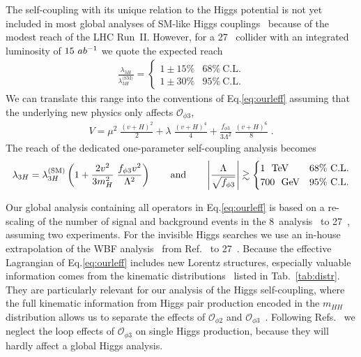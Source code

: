 The self-coupling with its unique relation to the Higgs potential is
not yet included in most global analyses of SM-like Higgs 
couplings~\cite{Ellis:2018gqa,Alves:2018nof,Biekotter:2018rhp}
because of the modest reach of the LHC Run~II.  
However, for a 27~\UTeV
collider with an integrated luminosity of $15~ab^{-1}$ we quote the
expected reach~\cite{Goncalves:2018yva}
%
\begin{align}
\frac{\lambda_{3H}}{\lambda_{3H}^\text{(SM)}}
=\begin{cases} 
1 \pm 15\% &  68\%~\text{C.L.} \\
1 \pm 30\% &  95\%~\text{C.L.} 
\end{cases}
\label{eq:reach_lam}
\end{align}
%
We can translate this range into the conventions of
Eq.\eqref{eq:ourleff} assuming that the underlying new physics
only affects $\mathcal{O}_{\phi 3}$,
%
\begin{align}
V = \mu^2 \; \frac{(v+H)^2}{2} 
  + \lambda \; \frac{(v+H)^4}{4} 
  + \frac{f_{\phi 3}}{3 \Lambda^2} \; \frac{(v+H)^6}{8} \; .
\end{align}
%
The reach of the dedicated one-parameter self-coupling
analysis becomes
%
\begin{align}
\lambda_{3H} 
= \lambda_{3H}^\text{(SM)}
  \left( 1 + \frac{2 v^2}{3 m_H^2} \; \frac{f_{\phi 3} v^2}{\Lambda^2} \right) 
\qquad \text{and} \qquad
\left| \frac{\Lambda}{\sqrt{f_{\phi 3}}} \right| \gtrsim
\begin{cases}
1~\text{\ensuremath{~\text{TeV}}} &  68\%~\text{C.L.} \\
700~\text{\ensuremath{~\text{GeV}}} &  95\%~\text{C.L.} 
\end{cases}
\label{eq:reach_d6}
\end{align}

Our global analysis containing all operators in Eq.\eqref{eq:ourleff}
is based on a re-scaling of the number of signal and background events 
in the 8~\UTeV analysis~\cite{Corbett:2015ksa} to 27~\UTeV, assuming two
experiments. For the invisible Higgs searches we use an in-house extrapolation of
the WBF analysis~\cite{Eboli:2000ze} from Ref.~\cite{Biekotter:2017gyu} to 27~\UTeV.  
Because the effective Lagrangian of Eq.\eqref{eq:ourleff} includes new
Lorentz structures, especially valuable information comes from the
kinematic distributions~\cite{Englert:2015hrx,Corbett:2015ksa} listed in Tab.~\ref{tab:distr}.
They are particularly relevant for our analysis of the Higgs self-coupling,
where the full kinematic information from Higgs pair production encoded in
the $m_{HH}$ distribution allows us to separate the effects of
$\mathcal{O}_{\phi 2}$ and $\mathcal{O}_{\phi  3}$~\cite{Kling:2016lay,Goncalves:2018yva}.
Following Refs.~\cite{Bizon:2016wgr,Maltoni:2017ims,DiVita:2017eyz} we neglect the loop effects
of $\mathcal{O}_{\phi 3}$ on single Higgs production, because they will
hardly affect a global Higgs analysis.  
\medskip

